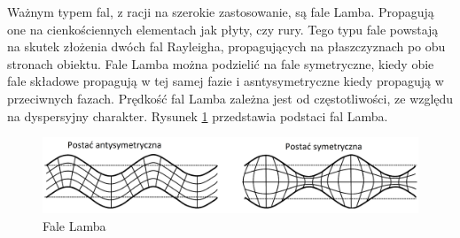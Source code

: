 Ważnym typem fal, z racji na szerokie zastosowanie, są fale Lamba. Propagują one na cienkościennych elementach jak płyty, czy rury. Tego typu fale powstają na skutek złożenia dwóch fal Rayleigha, propagujących na płaszczyznach po obu stronach obiektu. Fale Lamba można podzielić na fale symetryczne, kiedy obie fale składowe propagują w tej samej fazie i asntysymetryczne kiedy propagują w przeciwnych fazach. Prędkość fal Lamba zależna jest od częstotliwości, ze względu na dyspersyjny charakter. Rysunek \ref{fig:fala_lamba} przedstawia podstaci fal Lamba.

\begin{figure}[h]
\centering
\includegraphics[width=14cm]{Zdjecia/2/fala_lamba}
\caption{Fale Lamba}
\label{fig:fala_lamba}
\end{figure}






















